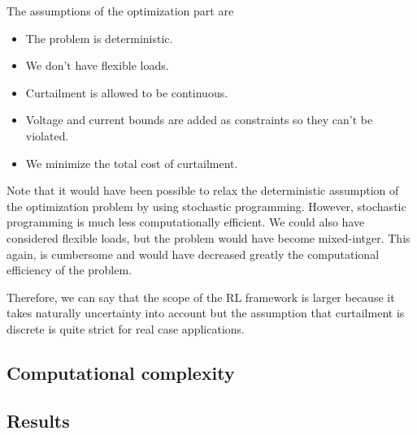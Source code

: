 The assumptions of the optimization part are
\begin{itemize}
\item The problem is deterministic.
\item We don't have flexible loads.
\item Curtailment is allowed to be continuous.
\item Voltage and current bounds are added as constraints so they can't be violated.
\item We minimize the total cost of curtailment. 
\end{itemize}

Note that it would have been possible to relax the deterministic assumption of the optimization problem by using stochastic programming.
However, stochastic programming is much less computationally efficient.
We could also have considered flexible loads, but the problem would have become mixed-intger.
This again, is cumbersome and would have decreased greatly the computational efficiency of the problem.

Therefore, we can say that the scope of the RL framework is larger because it takes naturally uncertainty into account but the assumption that curtailment is discrete is quite strict for real case applications.

\subsection{Computational complexity}



\subsection{Results}

